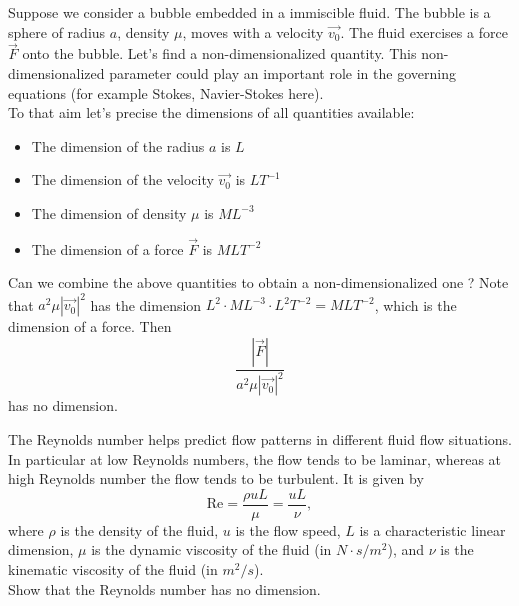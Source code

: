 \begin{Example}
Suppose we consider a bubble embedded in a immiscible fluid. The bubble is a sphere of radius $a$, density $\mu$, moves with a velocity $\vec{v_0}$. The fluid exercises a force $\vec{F}$ onto the bubble. Let's find a non-dimensionalized quantity. This non-dimensionalized parameter could play an important role in the governing equations (for example Stokes, Navier-Stokes here). \\

To that aim let's precise the dimensions of all quantities available:
 \begin{itemize}
 \item The dimension of the radius $a$ is $L$
\item The dimension of the velocity $\vec{v_0}$ is $L T^{-1}$ 
\item The dimension of density $\mu$ is $M L^{-3}$ 
\item The dimension of a force $\vec{F}$ is $ML T^{-2}$
\end{itemize}

Can we combine the above quantities to obtain a non-dimensionalized one ? Note that $a^2 \mu |\vec{v_0}|^2$ has the dimension $L^2  \cdot M L^{-3} \cdot L^2 T^{-2} =  ML T^{-2}$, which is the dimension of a force. Then 
\[ \displaystyle \frac{|\vec{F}|}{a^2 \mu |\vec{v_0}|^2}\]
has no dimension.
\end{Example}
\begin{Exercise}
The Reynolds number helps predict flow patterns in different fluid flow situations. In particular at low Reynolds numbers, the flow tends to be laminar, whereas at high Reynolds number the flow tends to be turbulent. It is given by
$$\displaystyle \mathrm {Re} =\frac{\rho u L}{\mu }=\frac{u L}{\nu },$$
where
$\rho$ is the density of the fluid, $u$ is the flow speed, $L$ is a characteristic linear dimension, $\mu$ is the dynamic viscosity of the fluid (in $N·s/m^2$), and $\nu$ is the kinematic viscosity of the fluid (in $m^2/s$).\\
Show that the Reynolds number has no dimension.
\dotfill

\dotfill

\dotfill

\dotfill

\dotfill

\dotfill

\dotfill

\dotfill

\dotfill

\dotfill
\end{Exercise}

